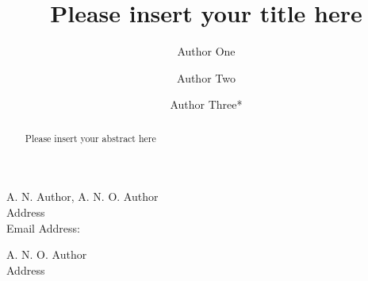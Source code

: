 \documentclass{WileyMSP-template}
\begin{document}
\pagestyle{fancy}


\title{Please insert your title here}

\maketitle


\author{Author One}
\author{Author Two}
\author{Author Three*}

\dedication{Optional dedication here. If no dedication is required, please leave blank}


\begin{affiliations}
A. N. Author, A. N. O. Author\\
Address\\
Email Address:

A. N. O. Author\\
Address

\end{affiliations}




\begin{abstract}

Please insert your abstract here

\end{abstract}

\end{document}
